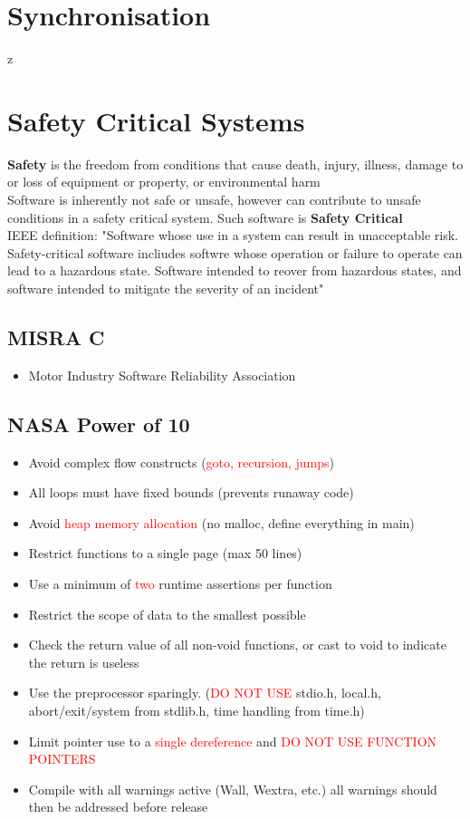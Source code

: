 \documentclass{book}
\begin{document}
    \chapter{Synchronisation}z
    \chapter{Safety Critical Systems}
        \textbf{Safety} is the freedom from conditions that cause death, injury, illness, damage
        to or loss of equipment or property, or environmental harm\\
        Software is inherently not safe or unsafe, however can contribute to unsafe conditions in a
        safety critical system. Such software is \textbf{Safety Critical}\\
        IEEE definition: "Software whose use in a system can result in unacceptable risk. Safety-critical
        software incliudes softwre whose operation or failure to operate can lead to a hazardous state.
        Software intended to reover from hazardous states, and software intended to mitigate the severity
        of an incident"
        \section{MISRA C}
            \begin{itemize}
                \item Motor Industry Software Reliability Association
            \end{itemize}
        \section{NASA Power of 10}
            \begin{itemize}
                \item Avoid complex flow constructs (\textcolor{red}{goto, recursion, jumps})
                \item All loops must have fixed bounds (prevents runaway code)
                \item Avoid \textcolor{red}{heap memory allocation} (no malloc, define everything in main)
                \item Restrict functions to a single page (max 50 lines)
                \item Use a minimum of \textcolor{red}{two} runtime assertions per function
                \item Restrict the scope of data to the smallest possible
                \item Check the return value of all non-void functions, or cast to void to indicate the return is useless
                \item Use the preprocessor sparingly. (\textcolor{red}{DO NOT USE} stdio.h, local.h, abort/exit/system from stdlib.h, time handling from time.h)
                \item Limit pointer use to a \textcolor{red}{single dereference} and \textcolor{red}{DO NOT USE FUNCTION POINTERS}
                \item Compile with all warnings active (Wall, Wextra, etc.) all warnings should then be addressed before release
            \end{itemize}
\end{document}
